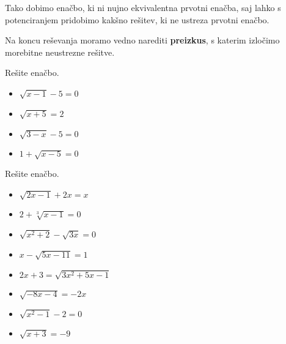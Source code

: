                 Tako dobimo enačbo, ki ni nujno ekvivalentna prvotni enačba, saj lahko s potenciranjem pridobimo kakšno rešitev, ki ne ustreza prvotni enačbo.

                Na koncu reševanja moramo vedno narediti \textbf{preizkus}, s katerim izločimo morebitne neustrezne rešitve.
            
        



        
            \begin{naloga}
                Rešite enačbo.
                \begin{itemize}
                    \item $\displaystyle \sqrt{x-1}-5=0$ 
                    \item $\displaystyle \sqrt{x+5}=2$ 
                    \item $\displaystyle \sqrt{3-x}-5=0$ 
                    \item $\displaystyle 1+\sqrt{x-5}=0$ 
                \end{itemize}
            \end{naloga}
        


        
            \begin{naloga}
                Rešite enačbo.
                \begin{itemize}
                    \item $\displaystyle \sqrt{2x-1}+2x=x$ 
                    \item $\displaystyle 2+\sqrt[3]{x-1}=0$ 
                    \item $\displaystyle \sqrt{x^2+2}-\sqrt{3x}=0$ 
                    \item $\displaystyle x-\sqrt{5x-11}=1$ 
                    \item $\displaystyle 2x+3=\sqrt{3x^2+5x-1}$ 
                    \item $\displaystyle \sqrt{-8x-4}=-2x$ 
                    \item $\displaystyle \sqrt{x^2-1}-2=0$ 
                    \item $\displaystyle \sqrt{x+3}=-9$ 
                \end{itemize}
            \end{naloga}
        


